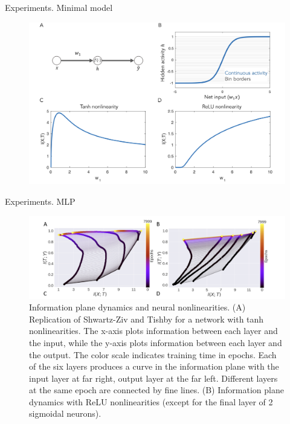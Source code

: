 \documentclass[13pt]{beamer}				\usepackage{graphicx}
\begin{document}
\begin{frame}{Experiments. Minimal model}
\begin{figure}[h!]
    \includegraphics[width=1\textwidth, trim={0 0 0 0cm},clip]{images/InfB1.jpg}
\end{figure}
\end{frame}

\begin{frame}{Experiments. MLP}
\begin{figure}[h!]
    \includegraphics[width=1\textwidth, trim={0 0 0 0cm},clip]{images/InfB2.jpg}
    \caption{Information plane dynamics and neural nonlinearities. (A) Replication of Shwartz-Ziv and Tishby for a network with tanh nonlinearities. The x-axis plots information between each layer and the input,
while the y-axis plots information between each layer and the output. The color scale indicates
training time in epochs. Each of the six layers produces a curve in the information plane with the
input layer at far right, output layer at the far left. Different layers at the same epoch are connected
by fine lines. (B) Information plane dynamics with ReLU nonlinearities (except for the final layer
of 2 sigmoidal neurons).}
\end{figure}
\end{frame}
\end{document}
